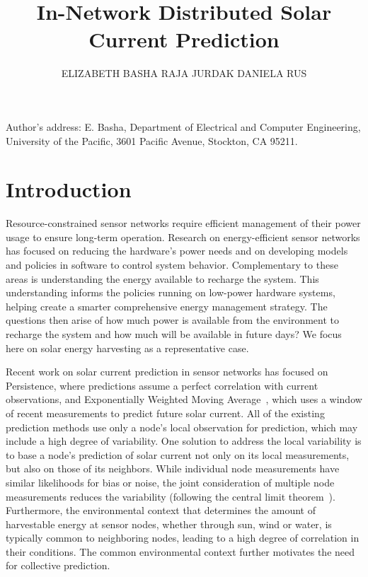 \documentclass[prodmode,acmtosn]{acmsmall}
\title{In-Network Distributed Solar Current Prediction}
\author{ELIZABETH BASHA
\affil{Massachusetts Institute of Technology, University of the Pacific}
RAJA JURDAK
\affil{CSIRO ICT Centre, University of Queensland}
DANIELA RUS
\affil{Massachusetts Institute of Technology}}
\begin{document}
\maketitle

\begin{bottomstuff}
Author's address: E. Basha, Department of Electrical and Computer Engineering,
University of the Pacific, 3601 Pacific Avenue, Stockton, CA
95211.\newline
\end{bottomstuff}

\section{Introduction}
Resource-constrained sensor networks  require efficient management of their power usage to ensure long-term operation.  
Research on energy-efficient sensor networks has focused on  reducing the hardware's power needs and on developing models and policies in software to control system behavior.
Complementary to these areas is understanding the energy available to recharge the system.
This understanding informs the policies running on low-power hardware systems, helping create a smarter comprehensive energy management strategy.
The questions then arise of how much power is available from the environment to recharge the system and how much will be available in future days? We focus here on solar energy harvesting as a representative case.

Recent work on solar current prediction in sensor networks has focused on Persistence, where predictions assume a perfect correlation with current observations, and Exponentially Weighted Moving Average~\cite{hsuISPLED2006,kansalDAC2006}, which uses a window of recent measurements to predict future solar current. All of the existing prediction methods use only a node's local observation for prediction, which may include a high degree of variability. One solution to address the local variability is to base a node's prediction of solar current not only on its local measurements, but also on those of its neighbors. While individual node measurements have similar likelihoods for bias or noise, the joint consideration of multiple node measurements reduces the variability (following the central limit theorem~\cite{jaynes2003}). Furthermore, the environmental context that determines the amount of harvestable energy at sensor nodes, whether through sun, wind or water, is typically common to neighboring nodes, leading to a high degree of correlation in their conditions. The common environmental context further motivates the need for collective prediction.
\end{document}
